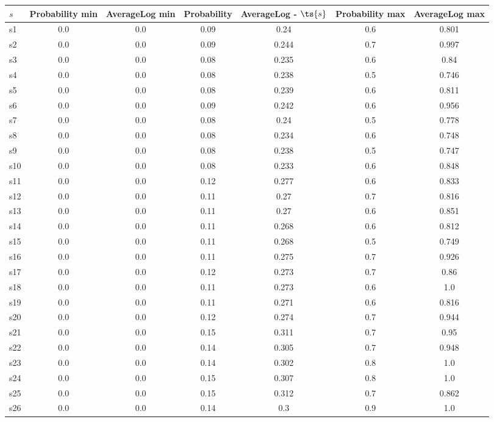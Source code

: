 \documentclass{article}
\begin{document}
\noindent\begin{tabular}{|l|c|c|c|c|c|c|}
\hline
$s$& Probability min & AverageLog min & Probability & AverageLog - $\ts{s}$ & Probability max & AverageLog max\\
\hline
s1 &0.0 & 0.0 & 0.09 & 0.24 & 0.6 & 0.801\\
\hline
s2 &0.0 & 0.0 & 0.09 & 0.244 & 0.7 & 0.997\\
\hline
s3 &0.0 & 0.0 & 0.08 & 0.235 & 0.6 & 0.84\\
\hline
s4 &0.0 & 0.0 & 0.08 & 0.238 & 0.5 & 0.746\\
\hline
s5 &0.0 & 0.0 & 0.08 & 0.239 & 0.6 & 0.811\\
\hline
s6 &0.0 & 0.0 & 0.09 & 0.242 & 0.6 & 0.956\\
\hline
s7 &0.0 & 0.0 & 0.08 & 0.24 & 0.5 & 0.778\\
\hline
s8 &0.0 & 0.0 & 0.08 & 0.234 & 0.6 & 0.748\\
\hline
s9 &0.0 & 0.0 & 0.08 & 0.238 & 0.5 & 0.747\\
\hline
s10 &0.0 & 0.0 & 0.08 & 0.233 & 0.6 & 0.848\\
\hline
s11 &0.0 & 0.0 & 0.12 & 0.277 & 0.6 & 0.833\\
\hline
s12 &0.0 & 0.0 & 0.11 & 0.27 & 0.7 & 0.816\\
\hline
s13 &0.0 & 0.0 & 0.11 & 0.27 & 0.6 & 0.851\\
\hline
s14 &0.0 & 0.0 & 0.11 & 0.268 & 0.6 & 0.812\\
\hline
s15 &0.0 & 0.0 & 0.11 & 0.268 & 0.5 & 0.749\\
\hline
s16 &0.0 & 0.0 & 0.11 & 0.275 & 0.7 & 0.926\\
\hline
s17 &0.0 & 0.0 & 0.12 & 0.273 & 0.7 & 0.86\\
\hline
s18 &0.0 & 0.0 & 0.11 & 0.273 & 0.6 & 1.0\\
\hline
s19 &0.0 & 0.0 & 0.11 & 0.271 & 0.6 & 0.816\\
\hline
s20 &0.0 & 0.0 & 0.12 & 0.274 & 0.7 & 0.944\\
\hline
s21 &0.0 & 0.0 & 0.15 & 0.311 & 0.7 & 0.95\\
\hline
s22 &0.0 & 0.0 & 0.14 & 0.305 & 0.7 & 0.948\\
\hline
s23 &0.0 & 0.0 & 0.14 & 0.302 & 0.8 & 1.0\\
\hline
s24 &0.0 & 0.0 & 0.15 & 0.307 & 0.8 & 1.0\\
\hline
s25 &0.0 & 0.0 & 0.15 & 0.312 & 0.7 & 0.862\\
\hline
s26 &0.0 & 0.0 & 0.14 & 0.3 & 0.9 & 1.0\\

\end{tabular}
\end{document}
